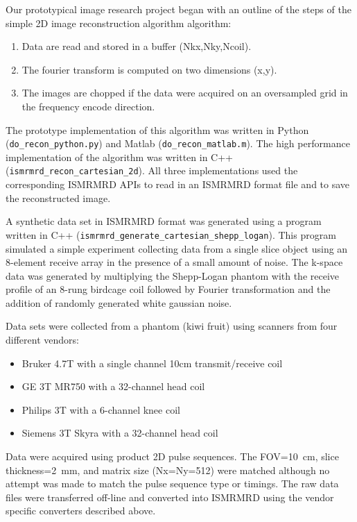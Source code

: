 \documentclass[12pt]{article}
\begin{document}
Our prototypical image research project began with an outline of the steps of the simple 2D image reconstruction algorithm algorithm:
\begin{enumerate}
\item Data are read and stored in a buffer (Nkx,Nky,Ncoil).
\item The fourier transform is computed on two dimensions (x,y).
\item The images are chopped if the data were acquired on an oversampled grid in the frequency encode direction.
\end{enumerate}
The prototype implementation of this algorithm was written in Python (\texttt{do\_recon\_python.py}) and Matlab (\texttt{do\_recon\_matlab.m}).  The high performance implementation of the algorithm was written in C++ (\texttt{ismrmrd\_recon\_cartesian\_2d}).  All three implementations used the corresponding ISMRMRD APIs to read in an ISMRMRD format file and to save the reconstructed image.

A synthetic data set in ISMRMRD format was generated using a program written in C++ (\texttt{ismrmrd\_generate\_cartesian\_shepp\_logan}).  This program simulated a simple experiment collecting data from a single slice object using an 8-element receive array in the presence of a small amount of noise.  The k-space data was generated by multiplying the Shepp-Logan phantom with the receive profile of an 8-rung birdcage coil followed by Fourier transformation and the addition of randomly generated white gaussian noise.

Data sets were collected from a phantom (kiwi fruit) using scanners from four different vendors: 
\begin{itemize}
\item Bruker 4.7T with a single channel 10cm transmit/receive coil
\item GE 3T MR750 with a 32-channel head coil
\item Philips 3T with a 6-channel knee coil
\item Siemens 3T Skyra with a 32-channel head coil
\end{itemize}
Data were acquired using product 2D pulse sequences.  The FOV=10~cm, slice thickness=2~mm, and matrix size (Nx=Ny=512) were matched although no attempt was made to match the pulse sequence type or timings.  The raw data files were transferred off-line and converted into ISMRMRD using the vendor specific converters described above.	
\end{document}
